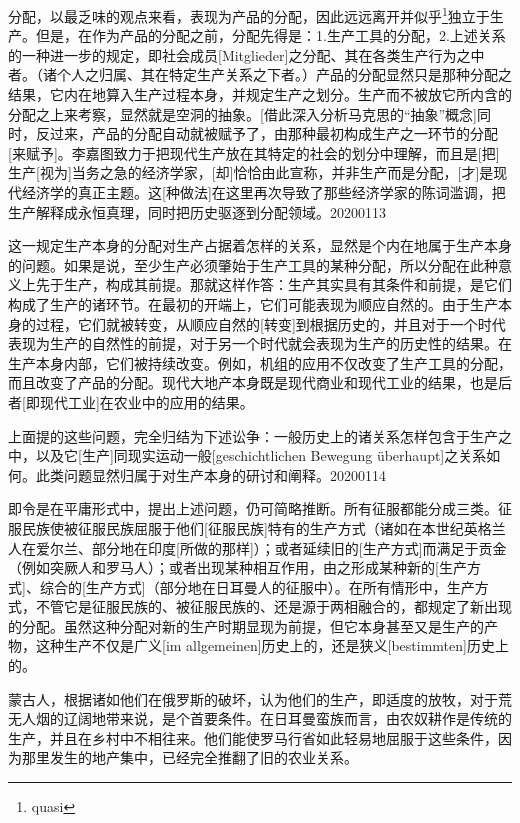\documentclass[a4paper,twoside,12pt]{ctexart}
\begin{document}
分配，以最乏味的观点来看，表现为产品的分配，因此远远离开并似乎\footnote{quasi}独立于生产。但是，在作为产品的分配之前，分配先得是：1.生产工具的分配，2.上述关系的一种进一步的规定，即社会成员[Mitglieder]之分配、其在各类生产行为之中者。（诸个人之归属、其在特定生产关系之下者。）产品的分配显然只是那种分配之结果，它内在地算入生产过程本身，并规定生产之划分。生产而不被放它所内含的分配之上来考察，显然就是空洞的抽象。[借此深入分析马克思的“抽象”概念]同时，反过来，产品的分配自动就被赋予了，由那种最初构成生产之一环节的分配[来赋予]。李嘉图致力于把现代生产放在其特定的社会的划分中理解，而且是[把]生产[视为]当务之急的经济学家，[却]恰恰由此宣称，并非生产而是分配，[才]是现代经济学的真正主题。这[种做法]在这里再次导致了那些经济学家的陈词滥调，把生产解释成永恒真理，同时把历史驱逐到分配领域。20200113

这一规定生产本身的分配对生产占据着怎样的关系，显然是个内在地属于生产本身的问题。如果是说，至少生产必须肇始于生产工具的某种分配，所以分配在此种意义上先于生产，构成其前提。那就这样作答：生产其实具有其条件和前提，是它们构成了生产的诸环节。在最初的开端上，它们可能表现为顺应自然的。由于生产本身的过程，它们就被转变，从顺应自然的[转变]到根据历史的，并且对于一个时代表现为生产的自然性的前提，对于另一个时代就会表现为生产的历史性的结果。在生产本身内部，它们被持续改变。例如，机组的应用不仅改变了生产工具的分配，而且改变了产品的分配。现代大地产本身既是现代商业和现代工业的结果，也是后者[即现代工业]在农业中的应用的结果。

上面提的这些问题，完全归结为下述讼争：一般历史上的诸关系怎样包含于生产之中，以及它[生产]同现实运动一般[geschichtlichen Bewegung überhaupt]之关系如何。此类问题显然归属于对生产本身的研讨和阐释。20200114

即令是在平庸形式中，提出上述问题，仍可简略推断。所有征服都能分成三类。征服民族使被征服民族屈服于他们[征服民族]特有的生产方式（诸如在本世纪英格兰人在爱尔兰、部分地在印度[所做的那样]）；或者延续旧的[生产方式]而满足于贡金（例如突厥人和罗马人）；或者出现某种相互作用，由之形成某种新的[生产方式]、综合的[生产方式]（部分地在日耳曼人的征服中）。在所有情形中，生产方式，不管它是征服民族的、被征服民族的、还是源于两相融合的，都规定了新出现的分配。虽然这种分配对新的生产时期显现为前提，但它本身甚至又是生产的产物，这种生产不仅是广义[im allgemeinen]历史上的，还是狭义[bestimmten]历史上的。

蒙古人，根据诸如他们在俄罗斯的破坏，认为他们的生产，即适度的放牧，对于荒无人烟的辽阔地带来说，是个首要条件。在日耳曼蛮族而言，由农奴耕作是传统的生产，并且在乡村中不相往来。他们能使罗马行省如此轻易地屈服于这些条件，因为那里发生的地产集中，已经完全推翻了旧的农业关系。
\end{document}
